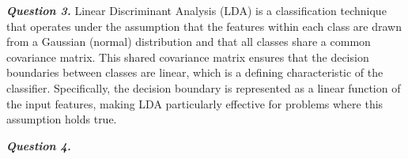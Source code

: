 \documentclass[12pt]{article}
\begin{document}
\textbf{\emph{Question 3.}}
Linear Discriminant Analysis (LDA) is a classification technique that operates under the assumption that the features within each class are drawn from a Gaussian (normal) distribution and that all classes share a common covariance matrix. This shared covariance matrix ensures that the decision boundaries between classes are linear, which is a defining characteristic of the classifier. Specifically, the decision boundary is represented as a linear function of the input features, making LDA particularly effective for problems where this assumption holds true.

\textbf{\emph{Question 4.}}
\end{document}
